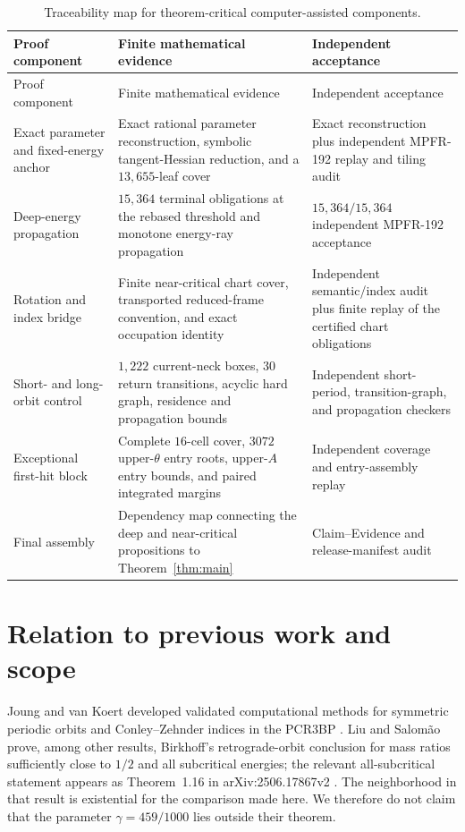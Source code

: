 \documentclass[11pt]{article}
\begin{document}
\begingroup\footnotesize
\begin{longtable}{@{}>{\raggedright\arraybackslash}p{}>{\raggedright\arraybackslash}p{}>{\raggedright\arraybackslash}p{}@{}}
\caption{Traceability map for theorem-critical computer-assisted components.}\label{tab:proof-evidence}\\
\toprule
Proof component & Finite mathematical evidence & Independent acceptance \\
\midrule
\endfirsthead
\toprule
Proof component & Finite mathematical evidence & Independent acceptance \\
\midrule
\endhead
Exact parameter and fixed-energy anchor & Exact rational parameter reconstruction, symbolic tangent-Hessian reduction, and a $13{,}655$-leaf cover & Exact reconstruction plus independent MPFR-192 replay and tiling audit \\
Deep-energy propagation & $15{,}364$ terminal obligations at the rebased threshold and monotone energy-ray propagation & $15{,}364/15{,}364$ independent MPFR-192 acceptance \\
Rotation and index bridge & Finite near-critical chart cover, transported reduced-frame convention, and exact occupation identity & Independent semantic/index audit plus finite replay of the certified chart obligations \\
Short- and long-orbit control & $1{,}222$ current-neck boxes, $30$ return transitions, acyclic hard graph, residence and propagation bounds & Independent short-period, transition-graph, and propagation checkers \\
Exceptional first-hit block & Complete $16$-cell cover, $3072$ upper-$\theta$ entry roots, upper-$A$ entry bounds, and paired integrated margins & Independent coverage and entry-assembly replay \\
Final assembly & Dependency map connecting the deep and near-critical propositions to Theorem~\ref{thm:main} & Claim--Evidence and release-manifest audit \\
\bottomrule
\end{longtable}
\endgroup

\section{Relation to previous work and scope}
Joung and van Koert developed validated computational methods for symmetric periodic orbits and Conley--Zehnder indices in the PCR3BP \citep{JoungVanKoert2025}. Liu and Salom\~ao prove, among other results, Birkhoff's retrograde-orbit conclusion for mass ratios sufficiently close to $1/2$ and all subcritical energies; the relevant all-subcritical statement appears as Theorem~1.16 in arXiv:2506.17867v2 \citep{LiuSalomao2025}. The neighborhood in that result is existential for the comparison made here. We therefore do not claim that the parameter $\gamma=459/1000$ lies outside their theorem.
\end{document}
